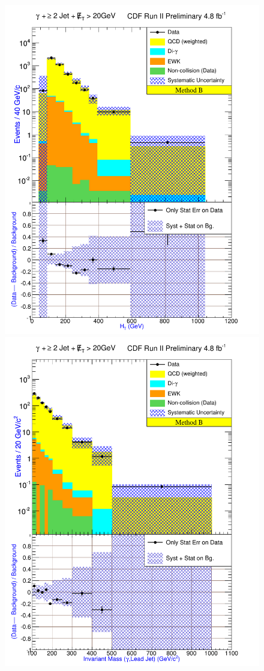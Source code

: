 \begin{figure}[h!]
\centering
{\includegraphics[keepaspectratio=true, scale=\resultsHistScale]{G30JetsMet20_MtdB_plot2_Ht.pdf}}
{\includegraphics[keepaspectratio=true, scale=\resultsHistScale]{G30JetsMet20_MtdB_plot2_InvMass_pj1.pdf}}

\end{figure}
